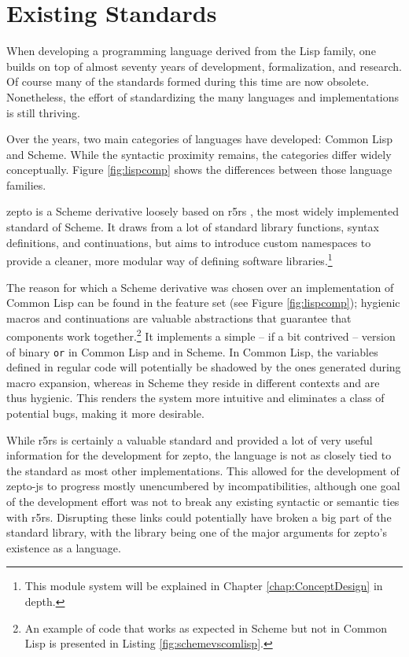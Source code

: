\documentclass[oneside,11pt,xetex]{scrbook}
\begin{document}
\section{Existing Standards}
\label{sec:ExistingStandards}

When developing a programming language derived from the Lisp family, one builds on
top of almost seventy years of development, formalization, and research. Of course
many of the standards formed during this time are now obsolete.
Nonetheless, the effort of standardizing the many languages and implementations
is still thriving.

Over the years, two main categories of languages have developed: Common Lisp
and Scheme. While the syntactic proximity remains, the categories differ
widely conceptually. Figure \ref{fig:lispcomp} shows the differences between
those language families.

zepto is a Scheme derivative loosely based on \gls{r5rs} \parencite{R5RS}, the most
widely implemented standard of Scheme. It draws from a lot of standard library
functions, syntax definitions, and continuations, but aims to introduce custom namespaces
to provide a cleaner, more modular way of defining software libraries.\footnote{This module
system will be explained in Chapter \ref{chap:ConceptDesign} in depth.}

The reason for which a Scheme derivative was chosen over an implementation of Common Lisp
can be found in the feature set (see Figure \ref{fig:lispcomp}); hygienic macros and
continuations are valuable abstractions that guarantee that components work
together.\footnote{An example of code that works as expected in Scheme but not in
Common Lisp is presented in Listing \ref{fig:schemevscomlisp}.} It
implements a simple – if a bit contrived – version of binary \texttt{or} in Common Lisp and
in Scheme. In Common Lisp, the variables defined in regular code will potentially be
shadowed by the ones generated during macro expansion, whereas in Scheme they reside in
different contexts and are thus hygienic. This renders the system more intuitive and eliminates
a class of potential bugs, making it more desirable.

While \gls{r5rs} is certainly a valuable standard and provided a lot of very useful information
for the development for zepto, the language is not as closely tied to the standard as most other
implementations. This allowed for the development of zepto-js to progress mostly unencumbered by
incompatibilities, although one goal of the development effort was not to break any existing
syntactic or semantic ties with \gls{r5rs}. Disrupting these links could potentially have broken
a big part of the standard library, with the library being one of the major arguments for zepto's
existence as a language.
\end{document}
